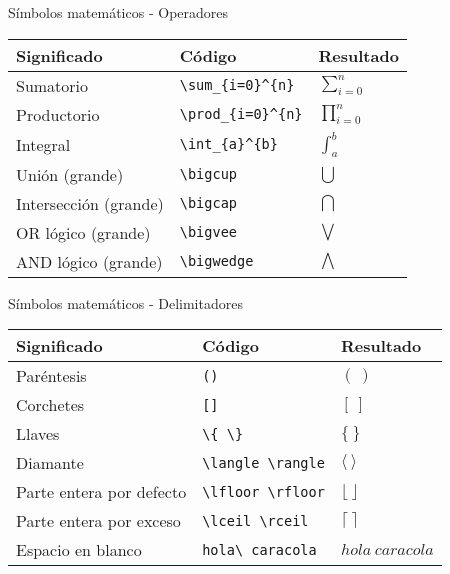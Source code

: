 \documentclass[
  ignorenonframetext,
]{beamer}
\begin{document}
\begin{frame}[fragile]{Símbolos matemáticos - Operadores}
\protect\hypertarget{suxedmbolos-matemuxe1ticos---operadores}{}
\begin{longtable}[]{@{}lll@{}}
\toprule
Significado & Código & Resultado \\
\midrule
\endhead
Sumatorio & \texttt{\textbackslash{}sum\_\{i=0\}\^{}\{n\}} &
\(\sum_{i=0}^{n}\) \\
Productorio & \texttt{\textbackslash{}prod\_\{i=0\}\^{}\{n\}} &
\(\prod_{i=0}^{n}\) \\
Integral & \texttt{\textbackslash{}int\_\{a\}\^{}\{b\}} &
\(\int_{a}^{b}\) \\
Unión (grande) & \texttt{\textbackslash{}bigcup} & \(\bigcup\) \\
Intersección (grande) & \texttt{\textbackslash{}bigcap} & \(\bigcap\) \\
OR lógico (grande) & \texttt{\textbackslash{}bigvee} & \(\bigvee\) \\
AND lógico (grande) & \texttt{\textbackslash{}bigwedge} &
\(\bigwedge\) \\
\bottomrule
\end{longtable}
\end{frame}

\begin{frame}[fragile]{Símbolos matemáticos - Delimitadores}
\protect\hypertarget{suxedmbolos-matemuxe1ticos---delimitadores}{}
\begin{longtable}[]{@{}lll@{}}
\toprule
Significado & Código & Resultado \\
\midrule
\endhead
Paréntesis & \texttt{()} & \((\ )\) \\
Corchetes & \texttt{{[}{]}} & \([\ ]\) \\
Llaves & \texttt{\textbackslash{}\{\ \textbackslash{}\}} & \(\{\ \}\) \\
Diamante & \texttt{\textbackslash{}langle\ \textbackslash{}rangle} &
\(\langle\ \rangle\) \\
Parte entera por defecto &
\texttt{\textbackslash{}lfloor\ \textbackslash{}rfloor} &
\(\lfloor\  \rfloor\) \\
Parte entera por exceso &
\texttt{\textbackslash{}lceil\ \textbackslash{}rceil} &
\(\lceil\ \rceil\) \\
Espacio en blanco & \texttt{hola\textbackslash{}\ caracola} &
\(hola\ caracola\) \\
\bottomrule
\end{longtable}
\end{frame}
\end{document}
